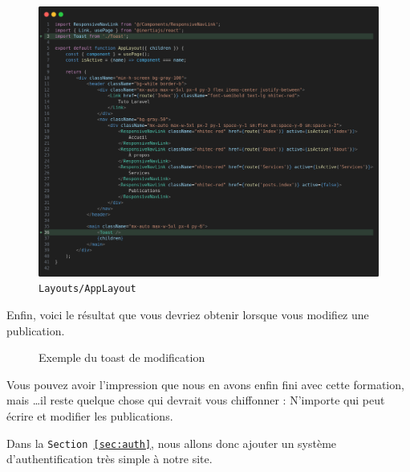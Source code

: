 \begin{figure}[!h]
    \includegraphics[width=0.5\linewidth]{figures-C1/applayout_toast.png}
    \captionsetup{
    justification=raggedright,
    singlelinecheck=false
    }
    \caption{\texttt{Layouts/AppLayout}}
    \label{fig:applayout_toast}
\end{figure}



Enfin, voici le résultat que vous devriez obtenir lorsque vous modifiez une publication.

\begin{figure}[!h]
    \centering
    \caption{Exemple du toast de modification}
    \label{fig:toast_picture}
\end{figure}

Vous pouvez avoir l'impression que nous en avons enfin fini avec cette formation, mais \ldots il reste quelque chose qui devrait vous chiffonner : N'importe qui peut écrire et modifier les publications.

Dans la \texttt{Section~\ref{sec:auth}}, nous allons donc ajouter un système d'authentification très simple à notre site.
